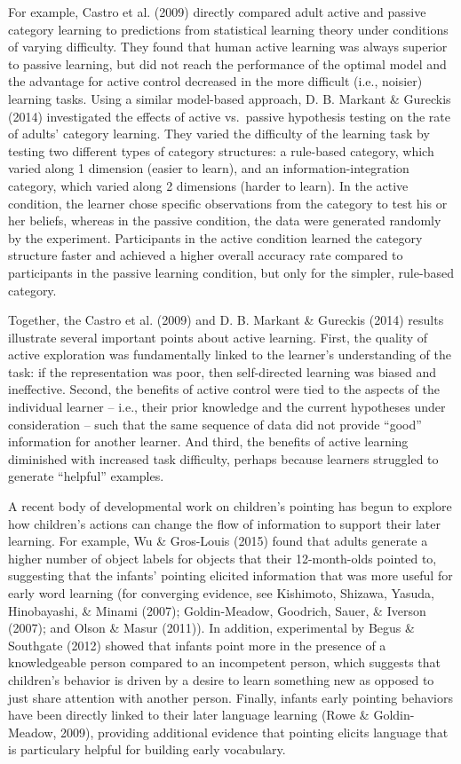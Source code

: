 \documentclass[a4paper,man,apacite,floatsintext]{apa6}
\begin{document}
For example, Castro et al. (2009) directly compared adult active and
passive category learning to predictions from statistical learning
theory under conditions of varying difficulty. They found that human
active learning was always superior to passive learning, but did not
reach the performance of the optimal model and the advantage for active
control decreased in the more difficult (i.e., noisier) learning tasks.
Using a similar model-based approach, D. B. Markant \& Gureckis (2014)
investigated the effects of active vs.~passive hypothesis testing on the
rate of adults' category learning. They varied the difficulty of the
learning task by testing two different types of category structures: a
rule-based category, which varied along 1 dimension (easier to learn),
and an information-integration category, which varied along 2 dimensions
(harder to learn). In the active condition, the learner chose specific
observations from the category to test his or her beliefs, whereas in
the passive condition, the data were generated randomly by the
experiment. Participants in the active condition learned the category
structure faster and achieved a higher overall accuracy rate compared to
participants in the passive learning condition, but only for the
simpler, rule-based category.

Together, the Castro et al. (2009) and D. B. Markant \& Gureckis (2014)
results illustrate several important points about active learning.
First, the quality of active exploration was fundamentally linked to the
learner's understanding of the task: if the representation was poor,
then self-directed learning was biased and ineffective. Second, the
benefits of active control were tied to the aspects of the individual
learner -- i.e., their prior knowledge and the current hypotheses under
consideration -- such that the same sequence of data did not provide
``good'' information for another learner. And third, the benefits of
active learning diminished with increased task difficulty, perhaps
because learners struggled to generate ``helpful'' examples.

A recent body of developmental work on children's pointing has begun to
explore how children's actions can change the flow of information to
support their later learning. For example, Wu \& Gros-Louis (2015) found
that adults generate a higher number of object labels for objects that
their 12-month-olds pointed to, suggesting that the infants' pointing
elicited information that was more useful for early word learning (for
converging evidence, see Kishimoto, Shizawa, Yasuda, Hinobayashi, \&
Minami (2007); Goldin-Meadow, Goodrich, Sauer, \& Iverson (2007); and
Olson \& Masur (2011)). In addition, experimental by Begus \& Southgate
(2012) showed that infants point more in the presence of a knowledgeable
person compared to an incompetent person, which suggests that children's
behavior is driven by a desire to learn something new as opposed to just
share attention with another person. Finally, infants early pointing
behaviors have been directly linked to their later language learning
(Rowe \& Goldin-Meadow, 2009), providing additional evidence that
pointing elicits language that is particulary helpful for building early
vocabulary.
\end{document}

